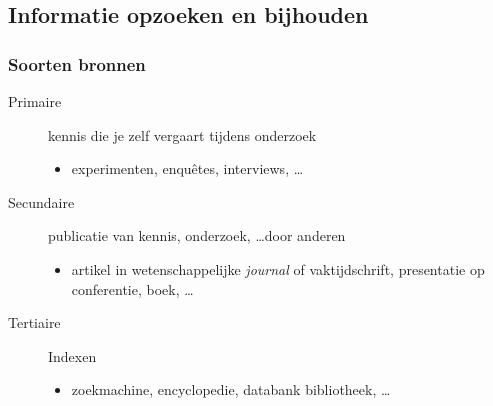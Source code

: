 \documentclass{beamer}
\begin{document}
\subsection{Informatie opzoeken en bijhouden}


\begin{frame}
  \frametitle{Soorten bronnen}

  \begin{description}
    \item[Primaire] kennis die je zelf vergaart tijdens onderzoek
      \begin{itemize}
        \item experimenten, enquêtes, interviews, \ldots
      \end{itemize}
    \item[Secundaire] publicatie van kennis, onderzoek, \ldots door anderen
      \begin{itemize}
        \item artikel in wetenschappelijke \emph{journal} of vaktijdschrift, presentatie op conferentie, boek, \ldots
      \end{itemize}
    \item[Tertiaire] Indexen
      \begin{itemize}
        \item zoekmachine, encyclopedie, databank bibliotheek, \ldots
      \end{itemize}
  \end{description}

\end{frame}
\end{document}
